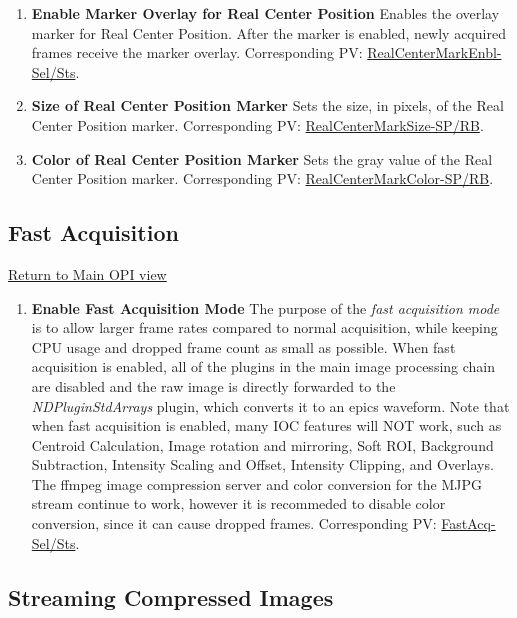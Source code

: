 \documentclass[openany]{article}
\begin{document}
\begin{enumerate}
            \item \textbf{Enable Marker Overlay for Real Center Position} Enables the overlay marker for Real Center Position. After the marker is enabled, newly acquired frames receive the marker overlay. Corresponding PV: \hyperlink{pv:real-center-mark-enbl}{RealCenterMarkEnbl-Sel/Sts}.
            \item \textbf{Size of Real Center Position Marker} Sets the size, in pixels, of the Real Center Position marker. Corresponding PV: \hyperlink{pv:real-center-mark-size}{RealCenterMarkSize-SP/RB}.
            \item \textbf{Color of Real Center Position Marker} Sets the gray value of the Real Center Position marker. Corresponding PV: \hyperlink{pv:real-center-mark-color}{RealCenterMarkColor-SP/RB}.
        \end{enumerate}

    \subsection{Fast Acquisition}\label{sec:fast-acq}

        \hyperref[fig:opi-main]{Return to Main OPI view}

        \begin{enumerate}
            \item \textbf{Enable Fast Acquisition Mode} The purpose of the \emph{fast acquisition mode} is to allow larger frame rates compared to normal acquisition, while keeping CPU usage and dropped frame count as small as possible. When fast acquisition is enabled, all of the plugins in the main image processing chain are disabled and the raw image is directly forwarded to the \emph{NDPluginStdArrays} plugin, which converts it to an epics waveform. Note that when fast acquisition is enabled, many IOC features will NOT work, such as Centroid Calculation, Image rotation and mirroring, Soft ROI, Background Subtraction, Intensity Scaling and Offset, Intensity Clipping, and Overlays. The ffmpeg image compression server and color conversion for the MJPG stream continue to work, however it is recommeded to disable color conversion, since it can cause dropped frames. Corresponding PV: \hyperlink{pv:fast-acq}{FastAcq-Sel/Sts}.
        \end{enumerate}

    \subsection{Streaming Compressed Images}\label{sec:compressed-img}
\end{document}
